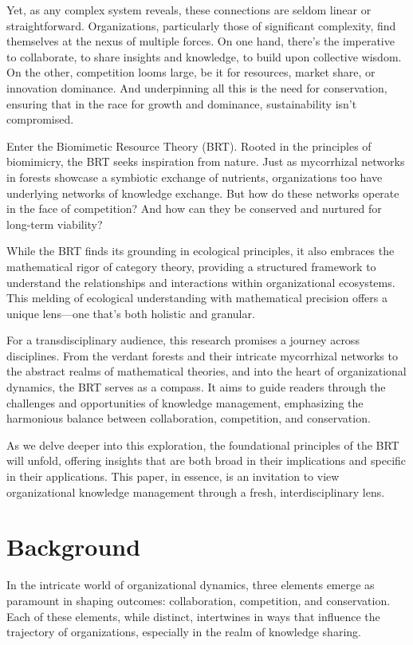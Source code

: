 \documentclass[sn-nature]{sn-jnl}%
\theoremstyle{thmstyleone}%
\theoremstyle{thmstyletwo}%
\theoremstyle{thmstylethree}%
\begin{document}
Yet, as any complex system reveals, these connections are seldom linear or straightforward. Organizations, particularly those of significant complexity, find themselves at the nexus of multiple forces. On one hand, there's the imperative to collaborate, to share insights and knowledge, to build upon collective wisdom. On the other, competition looms large, be it for resources, market share, or innovation dominance. And underpinning all this is the need for conservation, ensuring that in the race for growth and dominance, sustainability isn't compromised.

Enter the Biomimetic Resource Theory (BRT). Rooted in the principles of biomimicry, the BRT seeks inspiration from nature. Just as mycorrhizal networks in forests showcase a symbiotic exchange of nutrients, organizations too have underlying networks of knowledge exchange. But how do these networks operate in the face of competition? And how can they be conserved and nurtured for long-term viability?

While the BRT finds its grounding in ecological principles, it also embraces the mathematical rigor of category theory, providing a structured framework to understand the relationships and interactions within organizational ecosystems. This melding of ecological understanding with mathematical precision offers a unique lens—one that's both holistic and granular.

For a transdisciplinary audience, this research promises a journey across disciplines. From the verdant forests and their intricate mycorrhizal networks to the abstract realms of mathematical theories, and into the heart of organizational dynamics, the BRT serves as a compass. It aims to guide readers through the challenges and opportunities of knowledge management, emphasizing the harmonious balance between collaboration, competition, and conservation.

As we delve deeper into this exploration, the foundational principles of the BRT will unfold, offering insights that are both broad in their implications and specific in their applications. This paper, in essence, is an invitation to view organizational knowledge management through a fresh, interdisciplinary lens.

\section{Background}\label{sec2}

In the intricate world of organizational dynamics, three elements emerge as paramount in shaping outcomes: collaboration, competition, and conservation. Each of these elements, while distinct, intertwines in ways that influence the trajectory of organizations, especially in the realm of knowledge sharing.
\end{document}
